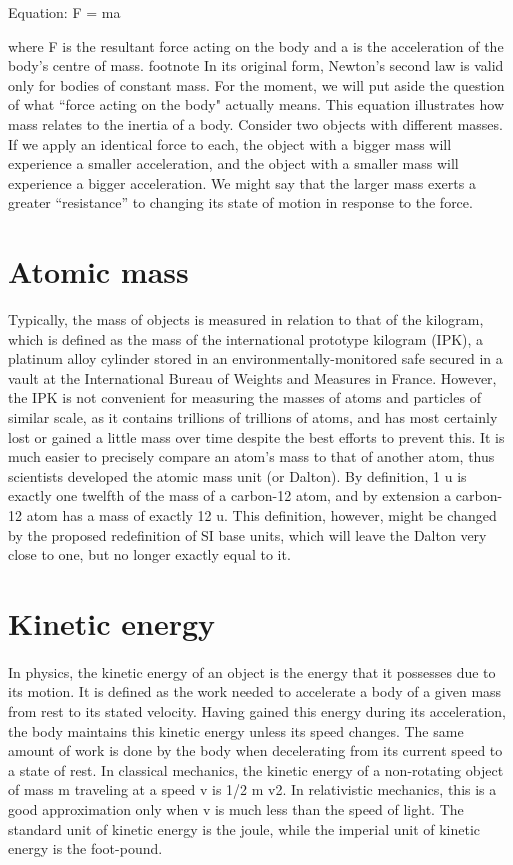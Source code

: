 \documentclass{book}
\begin{document}
	Equation: F = ma
	
	where F is the resultant force acting on the body and a is the acceleration of the body's centre of mass. footnote{ In its original form, Newton's second law is valid only for bodies of constant mass.} For the moment, we will put aside the question of what ``force acting on the body" actually means. This equation illustrates how mass relates to the inertia of a body. Consider two objects with different masses. If we apply an identical force to each, the object with a bigger mass will experience a smaller acceleration, and the object with a smaller mass will experience a bigger acceleration. We might say that the larger mass exerts a greater ``resistance'' to changing its state of motion in response to the force.
	
	\section{Atomic mass}
	Typically, the mass of objects is measured in relation to that of the kilogram, which is defined as the mass of the international prototype kilogram (IPK), a platinum alloy cylinder stored in an environmentally-monitored safe secured in a vault at the International Bureau of Weights and Measures in France. However, the IPK is not convenient for measuring the masses of atoms and particles of similar scale, as it contains trillions of trillions of atoms, and has most certainly lost or gained a little mass over time despite the best efforts to prevent this. It is much easier to precisely compare an atom's mass to that of another atom, thus scientists developed the atomic mass unit (or Dalton). By definition, 1 u is exactly one twelfth of the mass of a carbon-12 atom, and by extension a carbon-12 atom has a mass of exactly 12 u. This definition, however, might be changed by the proposed redefinition of SI base units, which will leave the Dalton very close to one, but no longer exactly equal to it.
	
	\section{Kinetic energy}
	\paragraph{}
	In physics, the kinetic energy of an object is the energy that it possesses due to its motion. It is defined as the work needed to accelerate a body of a given mass from rest to its stated velocity. Having gained this energy during its acceleration, the body maintains this kinetic energy unless its speed changes. The same amount of work is done by the body when decelerating from its current speed to a state of rest. In classical mechanics, the kinetic energy of a non-rotating object of mass m traveling at a speed v is 1/2 m v2. In relativistic mechanics, this is a good approximation only when v is much less than the speed of light. The standard unit of kinetic energy is the joule, while the imperial unit of kinetic energy is the foot-pound.
	
\end{document}
